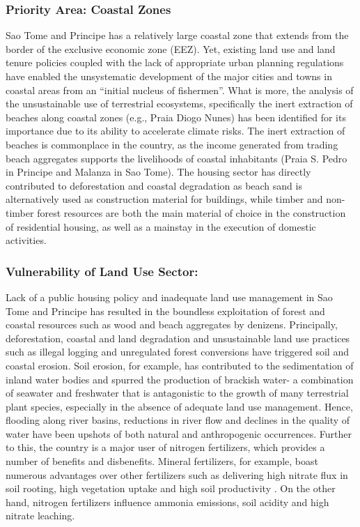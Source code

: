 \documentclass[
]{book}
\begin{document}
\hypertarget{priority-area-coastal-zones}{%
\subsubsection{Priority Area: Coastal Zones}\label{priority-area-coastal-zones}}

Sao Tome and Principe has a relatively large coastal zone that extends from the border of the exclusive economic zone (EEZ). Yet, existing land use and land tenure policies coupled with the lack of appropriate urban planning regulations have enabled the unsystematic development of the major cities and towns in coastal areas from an ``initial nucleus of fishermen''. What is more, the analysis of the unsustainable use of terrestrial ecosystems, specifically the inert extraction of beaches along coastal zones (e.g., Praia Diogo Nunes) has been identified for its importance due to its ability to accelerate climate risks. The inert extraction of beaches is commonplace in the country, as the income generated from trading beach aggregates supports the livelihoods of coastal inhabitants (Praia S. Pedro in Principe and Malanza in Sao Tome). The housing sector has directly contributed to deforestation and coastal degradation as beach sand is alternatively used as construction material for buildings, while timber and non-timber forest resources are both the main material of choice in the construction of residential housing, as well as a mainstay in the execution of domestic activities.

\hypertarget{vulnerability-of-land-use-sector}{%
\subsubsection{Vulnerability of Land Use Sector:}\label{vulnerability-of-land-use-sector}}

Lack of a public housing policy and inadequate land use management in Sao Tome and Principe has resulted in the boundless exploitation of forest and coastal resources such as wood and beach aggregates by denizens. Principally, deforestation, coastal and land degradation and unsustainable land use practices such as illegal logging and unregulated forest conversions have triggered soil and coastal erosion. Soil erosion, for example, has contributed to the sedimentation of inland water bodies and spurred the production of brackish water- a combination of seawater and freshwater that is antagonistic to the growth of many terrestrial plant species, especially in the absence of adequate land use management. Hence, flooding along river basins, reductions in river flow and declines in the quality of water have been upshots of both natural and anthropogenic occurrences. Further to this, the country is a major user of nitrogen fertilizers, which provides a number of benefits and disbenefits. Mineral fertilizers, for example, boast numerous advantages over other fertilizers such as delivering high nitrate flux in soil rooting, high vegetation uptake and high soil productivity . On the other hand, nitrogen fertilizers influence ammonia emissions, soil acidity and high nitrate leaching.
\end{document}
